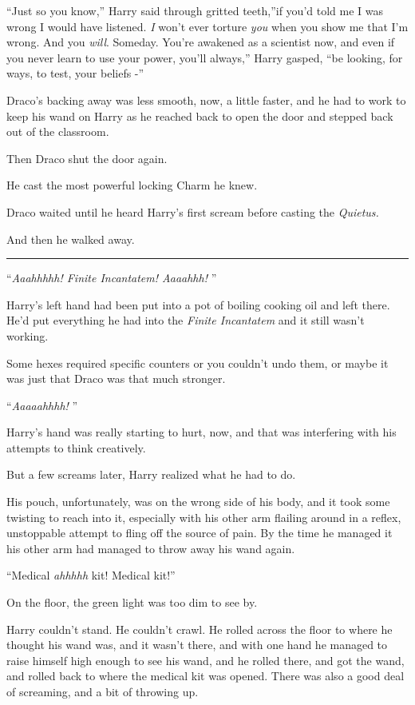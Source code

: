 ``Just so you know,'' Harry said through gritted teeth,''if you'd told
me I was wrong I would have listened. \emph{I} won't ever torture
\emph{you} when you show me that I'm wrong. And you \emph{will}.
Someday. You're awakened as a scientist now, and even if you never learn
to use your power, you'll always,'' Harry gasped, ``be looking, for
ways, to test, your beliefs -''

Draco's backing away was less smooth, now, a little faster, and he had
to work to keep his wand on Harry as he reached back to open the door
and stepped back out of the classroom.

Then Draco shut the door again.

He cast the most powerful locking Charm he knew.

Draco waited until he heard Harry's first scream before casting the
\emph{Quietus.}

And then he walked away.

\begin{center}\rule{3in}{0.4pt}\end{center}

``\emph{Aaahhhhh! Finite Incantatem! Aaaahhh!} ''

Harry's left hand had been put into a pot of boiling cooking oil and
left there. He'd put everything he had into the \emph{Finite Incantatem}
and it still wasn't working.

Some hexes required specific counters or you couldn't undo them, or
maybe it was just that Draco was that much stronger.

``\emph{Aaaaahhhh!} ''

Harry's hand was really starting to hurt, now, and that was interfering
with his attempts to think creatively.

But a few screams later, Harry realized what he had to do.

His pouch, unfortunately, was on the wrong side of his body, and it took
some twisting to reach into it, especially with his other arm flailing
around in a reflex, unstoppable attempt to fling off the source of pain.
By the time he managed it his other arm had managed to throw away his
wand again.

``Medical \emph{ahhhhh} kit! Medical kit!''

On the floor, the green light was too dim to see by.

Harry couldn't stand. He couldn't crawl. He rolled across the floor to
where he thought his wand was, and it wasn't there, and with one hand he
managed to raise himself high enough to see his wand, and he rolled
there, and got the wand, and rolled back to where the medical kit was
opened. There was also a good deal of screaming, and a bit of throwing
up.

